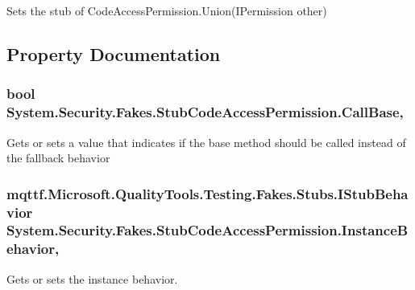 Sets the stub of Code\-Access\-Permission.\-Union(\-I\-Permission other)



\subsection{Property Documentation}
\hypertarget{class_system_1_1_security_1_1_fakes_1_1_stub_code_access_permission_a3b0ed6b61f9a1188e5ce7041720a6457}{
\subsubsection[{Call\-Base}]{\setlength{\rightskip}{0pt plus 5cm}bool System.\-Security.\-Fakes.\-Stub\-Code\-Access\-Permission.\-Call\-Base\hspace{0.3cm}{\ttfamily [get]}, {\ttfamily [set]}}}\label{class_system_1_1_security_1_1_fakes_1_1_stub_code_access_permission_a3b0ed6b61f9a1188e5ce7041720a6457}


Gets or sets a value that indicates if the base method should be called instead of the fallback behavior

\hypertarget{class_system_1_1_security_1_1_fakes_1_1_stub_code_access_permission_ac7ca92b56416392ba6193ec390bd772e}{
\subsubsection[{Instance\-Behavior}]{\setlength{\rightskip}{0pt plus 5cm}mqttf.\-Microsoft.\-Quality\-Tools.\-Testing.\-Fakes.\-Stubs.\-I\-Stub\-Behavior System.\-Security.\-Fakes.\-Stub\-Code\-Access\-Permission.\-Instance\-Behavior\hspace{0.3cm}{\ttfamily [get]}, {\ttfamily [set]}}}\label{class_system_1_1_security_1_1_fakes_1_1_stub_code_access_permission_ac7ca92b56416392ba6193ec390bd772e}


Gets or sets the instance behavior.

